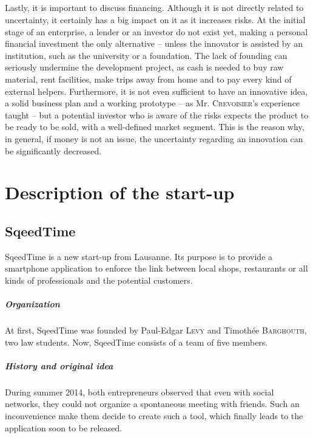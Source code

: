 \documentclass[twoside]{report}
\begin{document}
	\paragraph{}
	Lastly, it is important to discuss financing. Although it is not directly related to uncertainty, it certainly has a big impact on it as it increases risks. At the initial stage of an enterprise, a lender or an investor do not exist yet, making a personal financial investment the only alternative – unless the innovator is assisted by an institution, such as the university or a foundation. The lack of founding can seriously undermine the development project, as cash is needed to buy raw material, rent facilities, make trips away from home and to pay every kind of external helpers. Furthermore, it is not even sufficient to have an innovative idea, a solid business plan and a working prototype – as Mr. \textsc{Crevoisier}'s experience taught – but a potential investor who is aware of the risks expects the product to be ready to be sold, with a well-defined market segment. This is the reason why, in general, if money is not an issue, the uncertainty regarding an innovation can be significantly decreased.









	\chapter{Description of the start-up}
	\label{ch:description}
	\section{SqeedTime}
	SqeedTime is a new start-up from Lausanne. Its purpose is to provide a smartphone application to enforce the link between local shops, restaurants or all kinds of professionals and the potential customers.
	\paragraph{Organization}
	At first, SqeedTime was founded by Paul-Edgar \textsc{Levy} and Timothée \textsc{Barghouth}, two law students. Now, SqeedTime consists of a team of five members.
	\paragraph{History and original idea}
	During summer 2014, both entrepreneurs observed that even with social networks, they could not organize a spontaneous meeting with friends. Such an inconvenience make them decide to create such a tool, which finally leads to the application soon to be released.
\end{document}
